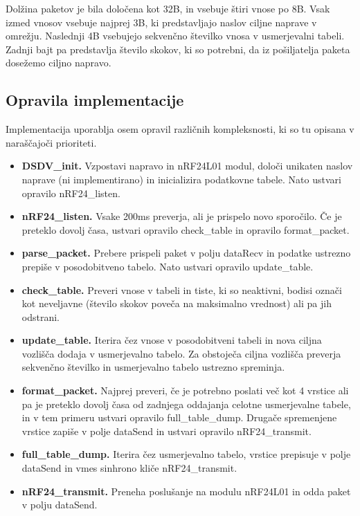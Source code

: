Dolžina paketov je bila določena kot 32B, in vsebuje štiri vnose po 8B. Vsak izmed vnosov vsebuje najprej 3B, ki predstavljajo naslov ciljne naprave v omrežju. Naslednji 4B vsebujejo sekvenčno številko vnosa v usmerjevalni tabeli. Zadnji bajt pa predstavlja število skokov, ki so potrebni, da iz pošiljatelja paketa dosežemo ciljno napravo.

\subsection{Opravila implementacije}
Implementacija uporablja osem opravil različnih kompleksnosti, ki so tu opisana v naraščajoči prioriteti.
\begin{itemize}
  \item \textbf{DSDV\_init.} Vzpostavi napravo in nRF24L01 modul, določi unikaten naslov naprave (ni implementirano) in inicializira podatkovne tabele. Nato ustvari opravilo nRF24\_listen.
  \item \textbf{nRF24\_listen.} Vsake 200ms preverja, ali je prispelo novo sporočilo. Če je preteklo dovolj časa, ustvari opravilo check\_table in opravilo format\_packet.
  \item \textbf{parse\_packet.} Prebere prispeli paket v polju dataRecv in podatke ustrezno prepiše v posodobitveno tabelo. Nato ustvari opravilo update\_table.
  \item \textbf{check\_table.} Preveri vnose v tabeli in tiste, ki so neaktivni, bodisi označi kot neveljavne (število skokov poveča na maksimalno vrednost) ali pa jih odstrani.
  \item \textbf{update\_table.} Iterira čez vnose v posodobitveni tabeli in nova ciljna vozlišča dodaja v usmerjevalno tabelo. Za obstoječa ciljna vozlišča preverja sekvenčno številko in usmerjevalno tabelo ustrezno spreminja.
  \item \textbf{format\_packet.} Najprej preveri, če je potrebno poslati več kot 4 vrstice ali pa je preteklo dovolj časa od zadnjega oddajanja celotne usmerjevalne tabele, in v tem primeru ustvari opravilo full\_table\_dump. Drugače spremenjene vrstice zapiše v polje dataSend in ustvari opravilo nRF24\_transmit.
  \item \textbf{full\_table\_dump.} Iterira čez usmerjevalno tabelo, vrstice prepisuje v polje dataSend in vmes sinhrono kliče nRF24\_transmit.
  \item \textbf{nRF24\_transmit.} Preneha poslušanje na modulu nRF24L01 in odda paket v polju dataSend.
\end{itemize}

